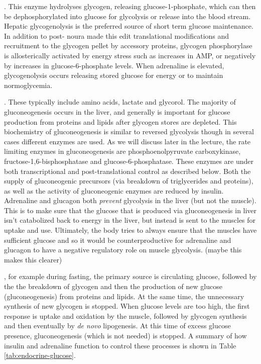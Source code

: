 \documentclass{tufte-handout}
\begin{document}
.  This enzyme hydrolyses glycogen, releasing glucose-1-phosphate, which can then be dephosphorylated into glucose for glycolysis or release into the blood stream.  Hepatic glycogenolysis is the preferred source of short term glucose maintenance.  In addition to post- noura made this edit translational modifications and recruitment to the glycogen pellet by accessory proteins, glycogen phosphorylase is allosterically activated by energy stress such as increases in AMP, or negatively by increases in glucose-6-phosphate levels.  When adrenaline is elevated, glycogenolysis occurs releasing stored glucose for energy or to maintain normoglycemia.

.  These typically include amino acids, lactate and glycorol.  The majority of gluconeogenesis occurs in the liver, and generally is important for glucose production from proteins and lipids after glycogen stores are depleted.  This biochemistry of gluconeogenesis is similar to reversed glycolysis though in several cases different enzymes are used.  As we will discuss later in the lecture, the rate limiting enzymes in gluconeogenesis are phosphoenolpyruvate carboxykinase, fructose-1,6-bisphosphatase and glucose-6-phosphatase.  These enzymes are under both transcriptional and post-translational control as described below.  Both the supply of gluconeogenic precursors (via breakdown of triglycerides and proteins), as well as the activity of gluconeogenic enzymes are reduced by insulin.  Adrenaline and glucagon both \emph{prevent} glycolysis in the liver (but not the muscle).  This is to make sure that the glucose that is produced via gluconeogenesis in liver isn't catabolized back to energy in the liver, but instead is sent to the muscles for uptake and use. Ultimately, the body tries to always ensure that the muscles have sufficient glucose and so it would be counterproductive for adrenaline and glucagon to have a negative regulatory role on muscle glycolysis. (maybe this makes this clearer)

, for example during fasting, the primary source is circulating glucose, followed by the the breakdown of glycogen and then the production of new glucose (gluconeogenesis) from proteins and lipids.  At the same time, the unnecessary synthesis of new glycogen is stopped.  When glucose levels are too high, the first response is uptake and oxidation by the muscle, followed by glycogen synthesis and then eventually by \textit{de novo} lipogenesis.  At this time of excess glucose presence, gluconeogenesis (which is not needed) is stopped.  A summary of how insulin and adrenaline function to control these processes is shown in Table \ref{tab:endocrine-glucose}.
\end{document}
